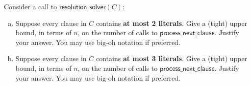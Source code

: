 \documentclass{article}
\begin{document}
Consider a call to $\mathsf{resolution\_solver}(C)$:

\begin{enumerate}[(a)]
\item Suppose every clause in $C$ contains \textbf{at most 2 literals}. Give a (tight) upper bound, in terms of $n$, on the number of calls to $\mathsf{process\_next\_clause}$. Justify your answer. You may use big-oh notation if preferred.
\item Suppose every clause in $C$ contains \textbf{at most 3 literals}. Give a (tight) upper bound, in terms of $n$, on the number of calls to $\mathsf{process\_next\_clause}$. Justify your answer. You may use big-oh notation if preferred.
\end{enumerate}


	
\end{document}
